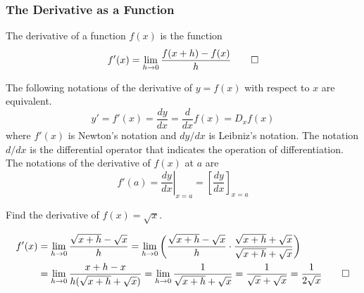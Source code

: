 \subsubsection{The Derivative as a Function}
\begin{definition}
    The derivative of a function \(f(x)\) is the function
    \[f'(x)=\lim_{h\to 0}\frac{f(x+h)-f(x)}{h}\qedhere\]
\end{definition}
The following notations of the derivative of \(y=f(x)\) with respect to \(x\)
are equivalent.
\[y'=f'(x)=\frac{dy}{dx}=\frac{d}{dx}f(x)=D_x f(x)\]
where \(f'(x)\) is Newton's notation and \(dy/dx\) is Leibniz's notation.
The notation \(d/dx\) is the differential operator that indicates the
operation of differentiation.
The notations of the derivative of \(f(x)\) at \(a\) are
\[f'(a)=\left.\frac{dy}{dx}\right|_{x=a}=\left[\frac{dy}{dx}\right]_{x=a}\]
\begin{problem}
    Find the derivative of \(f(x)=\sqrt{x}\).
\end{problem}
\begin{solution}
    \begin{align*}
        f'(x) &= \lim_{h\to 0}\frac{\sqrt{x+h}-\sqrt{x}}{h}=\lim_{h\to 0}
        \left(\frac{\sqrt{x+h}-\sqrt{x}}{h}\cdot
        \frac{\sqrt{x+h}+\sqrt{x}}{\sqrt{x+h}+\sqrt{x}}\right) \\
        &= \lim_{h\to 0}\frac{x+h-x}{h(\sqrt{x+h}+\sqrt{x})}
        =\lim_{h\to 0}\frac{1}{\sqrt{x+h}+\sqrt{x}}
        =\frac{1}{\sqrt{x}+\sqrt{x}}=\frac{1}{2\sqrt{x}} \qedhere
    \end{align*}
\end{solution}

